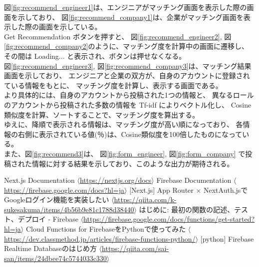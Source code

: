 \documentclass[10pt]{ltjsarticle}
\begin{document}
図\ref{fig:recommend_engineer1}は、エンジニアがマッチング画面を表示した際の画面を示しており、
図\ref{fig:recommend_company1}は、企業がマッチング画面を表示した際の画面を示している。\\
\indent Get Recommendation ボタンを押すと、
図\ref{fig:recommend_engineer2}, 図\ref{fig:recommend_company2}のように、マッチング度を計算中の画面に遷移し、
その間は Loading... と表示され、ボタンは押せなくなる。\\
\indent 図\ref{fig:recommend_engineer3}, 図\ref{fig:recommend_company3}は、マッチング結果画面を示しており、
エンジニアと企業の双方が、自身のアカウントに登録されている情報をもとに、
マッチング度を計算し、表示する画面である。\\
\indent より具体的には、自身のアカウントから投稿された1つの情報と、
異なるロールのアカウントから投稿された多数の情報を Tf-idf によりベクトル化し、
Cosine類似度を計算、ソートすることで、マッチング度を算出する。\\
\indent ゆえに、降順で表示される情報は、マッチング度が高い順になっており、
各情報の右側に表示されている値(％)は、Cosine類似度を100倍したものになっている。\\
\indent また、図\ref{fig:recommend3}は、
図\ref{fig:form_engineer}, 図\ref{fig:form_company} 
で投稿された情報に対する結果を示しており、このような出力が期待される。

\begin{thebibliography}{9}
     Next.js Documentation $\langle$\url{https://nextjs.org/docs}$\rangle$
     Firebase Documentation $\langle$\url{https://firebase.google.com/docs?hl=ja}$\rangle$
     [Next.js] App Router × NextAuth.jsでGoogleログイン機能を実装したい $\langle$\url{https://qiita.com/k-sukesakuma/items/4b56b9e81c1788d38440}$\rangle$
     はじめに: 最初の関数の記述、テスト、デプロイ - Firebase $\langle$\url{https://firebase.google.com/docs/functions/get-started?hl=ja}$\rangle$
     Cloud Functions for FirebaseをPythonで使ってみた $\langle$\url{https://dev.classmethod.jp/articles/firebase-functions-python/}$\rangle$
     [python] Firebase Realtime Databaseのはじめ方 $\langle$\url{https://qiita.com/sai-san/items/24dbee74c5744033c330}$\rangle$
\end{thebibliography}
\end{document}
